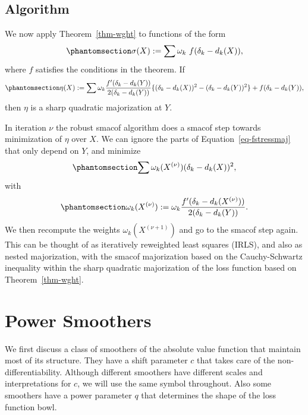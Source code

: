 \documentclass[
  12pt,
  letterpaper,
  DIV=11,
  numbers=noendperiod]{scrartcl}
\newcommand{\sectionbreak}{\pagebreak}
\theoremstyle{definition}
\theoremstyle{definition}
\theoremstyle{plain}
\theoremstyle{plain}
\theoremstyle{plain}
\theoremstyle{remark}
\begin{document}
\subsection{Algorithm}\label{algorithm}

We now apply Theorem~\ref{thm-wght} to functions of the form
\begin{equation}\phantomsection\label{eq-fstressdef}{
\sigma(X):=\sum \omega_k\ f(\delta_k-d_k(X)),
}\end{equation} where \(f\) satisfies the conditions in the theorem. If
\begin{equation}\phantomsection\label{eq-fstressmaj}{
\eta(X):=\sum \omega_k\frac{f'(\delta_k-d_k(Y))}{2(\delta_k-d_k(Y))}\{(\delta_k-d_k(X))^2-(\delta_k-d_k(Y))^2\}+f(\delta_k-d_k(Y)),
}\end{equation} then \(\eta\) is a sharp quadratic majorization at
\(Y\).

In iteration \(\nu\) the robust smacof algorithm does a smacof step
towards minimization of \(\eta\) over \(X\). We can ignore the parts of
Equation~\ref{eq-fstressmaj} that only depend on \(Y\), and minimize
\begin{equation}\phantomsection\label{eq-fstressaux}{
\sum\omega_k(X^{(\nu)})(\delta_k-d_k(X))^2,
}\end{equation} with \begin{equation}\phantomsection\label{eq-wkdef}{
\omega_k(X^{(\nu)}):=\omega_k\frac{f'(\delta_k-d_k(X^{(\nu)}))}{2(\delta_k-d_k(Y))}.
}\end{equation} We then recompute the weights \(\omega_k(X^{(\nu+1)})\)
and go to the smacof step again. This can be thought of as iteratively
reweighted least squares (IRLS), and also as nested majorization, with
the smacof majorization based on the Cauchy-Schwartz inequality within
the sharp quadratic majorization of the loss function based on
Theorem~\ref{thm-wght}.

\sectionbreak

\section{Power Smoothers}\label{power-smoothers}

We first discuss a class of smoothers of the absolute value function
that maintain most of its structure. They have a shift parameter \(c\)
that takes care of the non-differentiability. Although different
smoothers have different scales and interpretations for \(c\), we will
use the same symbol throughout. Also some smoothers have a power
parameter \(q\) that determines the shape of the loss function bowl.
\end{document}
